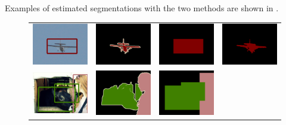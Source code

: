 Examples of estimated segmentations with the two methods are
shown in .

\begin{figure}
  \centering
  \begin{tabular}{c c c c}
    \includegraphics[width=0.21\linewidth]{fig/erode_bbox/img/2010_004063.jpg} & 
    \includegraphics[width=0.21\linewidth]{fig/erode_bbox/gt/2010_004063.png} & 
    \includegraphics[width=0.21\linewidth]{fig/erode_bbox/bbox/2010_004063.png} & 
    \includegraphics[width=0.21\linewidth]{fig/erode_bbox/crf/2010_004063.png} \\    
    \includegraphics[width=0.21\linewidth]{fig/erode_bbox/img/2009_000219.jpg} & 
    \includegraphics[width=0.21\linewidth]{fig/erode_bbox/gt/2009_000219.png} & 
    \includegraphics[width=0.21\linewidth]{fig/erode_bbox/bbox/2009_000219.png} & 

\end{tabular}
\end{figure}
